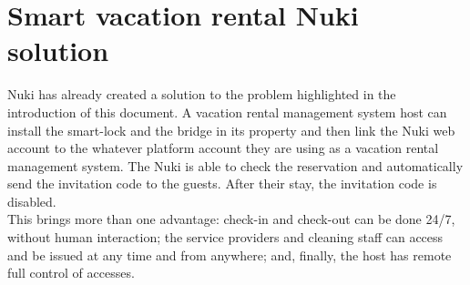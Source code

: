 \section{Smart vacation rental Nuki solution}
Nuki has already created a solution to the problem highlighted in the introduction of this document. A vacation rental management system host can install the smart-lock and the bridge in its property and then link the Nuki web account to the whatever platform account they are using as a vacation rental management system. The Nuki is able to check the reservation and automatically send the invitation code to the guests. After their stay, the invitation code is disabled. 
\\ This brings more than one advantage: check-in and check-out can be done 24/7, without human interaction; the service providers and cleaning staff can access and be issued at any time and from anywhere; and, finally, the host has remote full control of accesses.
